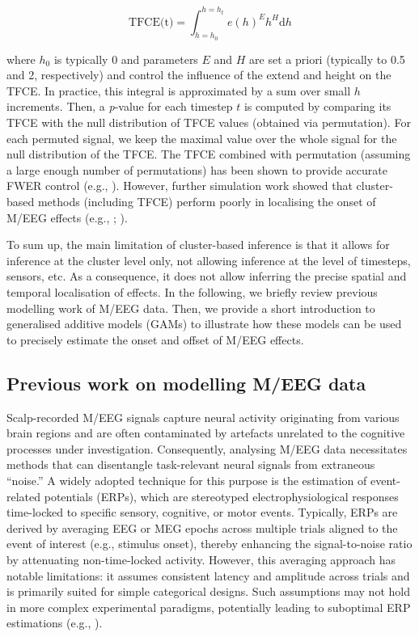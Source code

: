 \documentclass[
  doc,
  floatsintext,
  longtable,
  a4paper,
  nolmodern,
  notxfonts,
  notimes,
  colorlinks=true,linkcolor=blue,citecolor=blue,urlcolor=blue]{apa7}
\begin{document}
\[
\text{TFCE(t)} = \int_{h=h_{0}}^{h=h_{t}} e(h)^{E} h^{H} \mathrm{d}h
\]

where \(h_{0}\) is typically \(0\) and parameters \(E\) and \(H\) are
set a priori (typically to 0.5 and 2, respectively) and control the
influence of the extend and height on the TFCE. In practice, this
integral is approximated by a sum over small \(h\) increments. Then, a
\emph{p}-value for each timestep \(t\) is computed by comparing its TFCE
with the null distribution of TFCE values (obtained via permutation).
For each permuted signal, we keep the maximal value over the whole
signal for the null distribution of the TFCE. The TFCE combined with
permutation (assuming a large enough number of permutations) has been
shown to provide accurate FWER control (e.g.,
). However, further
simulation work showed that cluster-based methods (including TFCE)
perform poorly in localising the onset of M/EEG effects (e.g.,
;
).

To sum up, the main limitation of cluster-based inference is that it
allows for inference at the cluster level only, not allowing inference
at the level of timesteps, sensors, etc. As a consequence, it does not
allow inferring the precise spatial and temporal localisation of
effects. In the following, we briefly review previous modelling work of
M/EEG data. Then, we provide a short introduction to generalised
additive models (GAMs) to illustrate how these models can be used to
precisely estimate the onset and offset of M/EEG effects.

\subsection{Previous work on modelling M/EEG
data}\label{previous-work-on-modelling-meeg-data}

Scalp-recorded M/EEG signals capture neural activity originating from
various brain regions and are often contaminated by artefacts unrelated
to the cognitive processes under investigation. Consequently, analysing
M/EEG data necessitates methods that can disentangle task-relevant
neural signals from extraneous ``noise.'' A widely adopted technique for
this purpose is the estimation of event-related potentials (ERPs), which
are stereotyped electrophysiological responses time-locked to specific
sensory, cognitive, or motor events. Typically, ERPs are derived by
averaging EEG or MEG epochs across multiple trials aligned to the event
of interest (e.g., stimulus onset), thereby enhancing the
signal-to-noise ratio by attenuating non-time-locked activity. However,
this averaging approach has notable limitations: it assumes consistent
latency and amplitude across trials and is primarily suited for simple
categorical designs. Such assumptions may not hold in more complex
experimental paradigms, potentially leading to suboptimal ERP
estimations (e.g., ).
\end{document}
